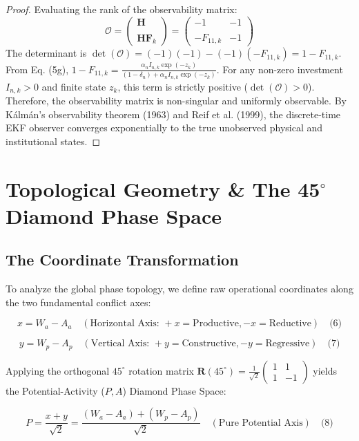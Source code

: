 \documentclass[preprint,12pt,authoryear]{elsarticle}
\theoremstyle{definition}
\begin{document}
\begin{proof} Evaluating the rank of the observability matrix: $$\mathcal{O} = \begin{pmatrix} \mathbf{H} \\\\ \mathbf{H} \mathbf{F}_k \end{pmatrix} = \begin{pmatrix} -1 & -1 \\\\ -F_{11,k} & -1 \end{pmatrix}$$ The determinant is $\det(\mathcal{O}) = (-1)(-1) - (-1)(-F_{11,k}) = 1 - F_{11,k}$. From Eq. (5g), $1 - F_{11,k} = \frac{\alpha_n I_{n,k} \exp(-z_k)}{(1 - \delta_n) + \alpha_n I_{n,k} \exp(-z_k)}$. For any non-zero investment $I_{n,k} > 0$ and finite state $z_k$, this term is strictly positive ($\det(\mathcal{O}) > 0$). Therefore, the observability matrix is non-singular and uniformly observable. By K\'alm\'an's observability theorem (1963) and Reif et al. (1999), the discrete-time EKF observer converges exponentially to the true unobserved physical and institutional states. \end{proof}

\section{Topological Geometry \& The 45$^\circ$ Diamond Phase Space}

\subsection{The Coordinate Transformation}

To analyze the global phase topology, we define raw operational coordinates along the two fundamental conflict axes:

$$x = W_a - A_a \quad ( \text{Horizontal Axis: } +x = \text{Productive}, -x = \text{Reductive}) \quad \text{(6)}$$

$$y = W_p - A_p \quad ( \text{Vertical Axis: } +y = \text{Constructive}, -y = \text{Regressive}) \quad \text{(7)}$$

Applying the orthogonal $45^\circ$ rotation matrix $\mathbf{R}(45^\circ) = \frac{1}{\sqrt{2}}  \begin{pmatrix} 1 & 1 \\ 1 & -1 \end{pmatrix}$ yields the Potential-Activity ($P, A$) Diamond Phase Space:

$$P = \frac{x + y}{\sqrt{2}} = \frac{(W_a - A_a) + (W_p - A_p)}{\sqrt{2}} \quad ( \text{Pure Potential Axis}) \quad \text{(8)}$$
\end{document}

